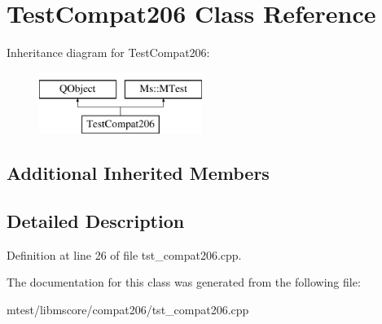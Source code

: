 \hypertarget{class_test_compat206}{}\section{Test\+Compat206 Class Reference}
\label{class_test_compat206}
Inheritance diagram for Test\+Compat206\+:\begin{figure}[H]
\begin{center}
\leavevmode
\includegraphics[height=2.000000cm]{class_test_compat206}
\end{center}
\end{figure}
\subsection*{Additional Inherited Members}


\subsection{Detailed Description}


Definition at line 26 of file tst\+\_\+compat206.\+cpp.



The documentation for this class was generated from the following file\+:\begin{DoxyCompactItemize}
\item 
mtest/libmscore/compat206/tst\+\_\+compat206.\+cpp\end{DoxyCompactItemize}
